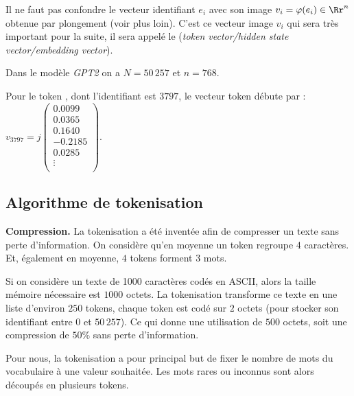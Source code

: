 \documentclass[11pt,class=report,crop=false]{standalone}
\begin{document}
Il ne faut pas confondre le vecteur identifiant $e_i$ avec son image $v_i  = \varphi(e_i) \in \Rr^n$ obtenue par plongement (voir plus loin). C'est ce vecteur image $v_i$ qui sera très important pour la suite, il sera appelé le  (\emph{token vector/hidden state vector/embedding vector}).


\begin{exemple}
	
Dans le modèle \emph{GPT2} on a $N = 50\,257$ et $n=768$.


Pour le token , dont l'identifiant est $3797$, le vecteur token débute par :
$v_{3797} = 
j\left(\begin{smallmatrix}
0.0099 \\
0.0365 \\  
0.1640 \\
-0.2185 \\   
0.0285 \\
\vdots \\
\end{smallmatrix}\right).$
	
\end{exemple}

\subsection{Algorithme de tokenisation}

\textbf{Compression.}
La tokenisation a été inventée afin de compresser un texte sans perte d'information.
On considère qu'en moyenne un token regroupe $4$ caractères.
Et, également en moyenne, $4$ tokens forment $3$ mots.

\begin{exemple}
Si on considère un texte de 1000 caractères codés en ASCII, alors la taille mémoire nécessaire est $1000$ octets. La tokenisation transforme ce texte en une liste d'environ $250$ tokens, chaque token est codé sur $2$ octets (pour stocker son identifiant entre $0$ et $50\,257$). Ce qui donne une utilisation de $500$ octets, soit une compression de $50 \%$ sans perte d'information.
\end{exemple}

Pour nous, la tokenisation a pour principal but de fixer le nombre de mots du vocabulaire à une valeur souhaitée. Les mots rares ou inconnus sont alors découpés en plusieurs tokens.
\end{document}
